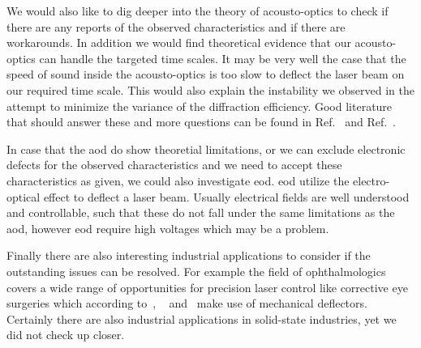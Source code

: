 We would also like to dig deeper into the theory of acousto-optics to check
if there are any reports of the observed characteristics and if there are
workarounds. In addition we would find theoretical evidence that our
acousto-optics can handle the targeted time scales. It may be very well the
case that the speed of sound inside the acousto-optics is too slow to deflect
the laser beam on our required time scale. This would also explain the
instability we observed in the attempt to minimize the variance of the
diffraction efficiency. Good literature that should answer these and more
questions can be found in Ref.~\cite{Goutzoulis1994} and Ref.~\cite{Royer1999}.

In case that the \gls{aod} do show theoretial limitations, or we can exclude
electronic defects for the observed characteristics and we need to accept
these characteristics as given, we could also investigate \gls{eod}. \gls{eod}
utilize the electro-optical effect to deflect a laser beam. Usually electrical
fields are well understood and controllable, such that these do not fall under
the same limitations as the \gls{aod}, however \gls{eod} require high voltages
which may be a problem.

Finally there are also interesting industrial applications to consider if the
outstanding issues can be resolved. For example the field of ophthalmologics
covers a wide range of opportunities for precision laser control like
corrective eye surgeries which according to~\cite{US20180110655},
~\cite{US20180064579} and~\cite{US7131968} make use of mechanical deflectors.
Certainly there are also industrial applications in solid-state industries,
yet we did not check up closer.
